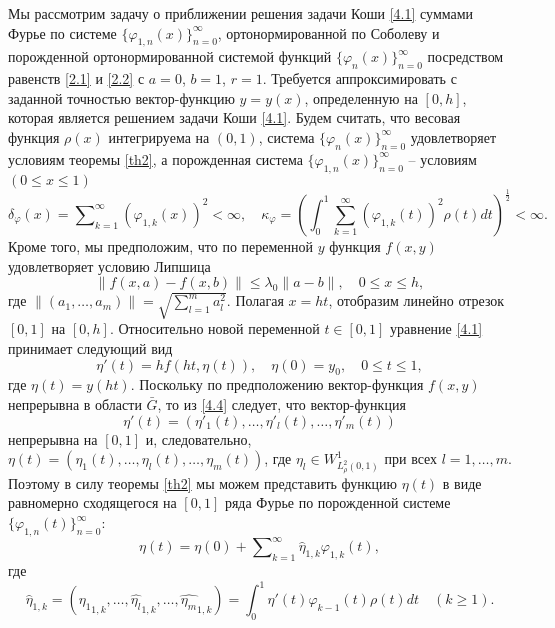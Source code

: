 Мы рассмотрим задачу о приближении решения задачи Коши \eqref{4.1}     суммами  Фурье по системе $\{\varphi_{1,n}(x)\}_{n=0}^\infty$, ортонормированной по Соболеву и порожденной ортонормированной системой функций $\{\varphi_{n}(x)\}_{n=0}^\infty$ посредством равенств \eqref{2.1} и \eqref{2.2} с $a=0$, $b=1$, $r=1$.
Требуется аппроксимировать с заданной точностью вектор-функцию $y=y(x)$, определенную на $[0,h]$, которая является решением задачи Коши \eqref{4.1}.
Будем считать, что весовая функция $\rho(x)$ интегрируема на $(0,1)$, система $\{\varphi_{n}(x)\}_{n=0}^\infty$ удовлетворяет условиям теоремы \ref{th2}, а порожденная система $\{\varphi_{1,n}(x)\}_{n=0}^\infty$ -- условиям $(0\le x\le 1)$
\begin{equation}\label{4.2}
\delta_\varphi(x)=\sum\nolimits_{k=1}^{\infty}(\varphi_{1,k}(x))^2<\infty,\quad
\kappa_{\varphi}=\left(\int_0^1\sum_{k=1}^{\infty}
(\varphi_{1,k}(t))^2\rho(t)dt\right)^{\frac12}<\infty.
\end{equation}
Кроме того, мы предположим, что по переменной $y$ функция $f(x,y)$ удовлетворяет условию Липшица
\begin{equation}\label{4.3}
\|f(x,a)-f(x,b)\|\le \lambda_0\|a-b\|, \quad 0\le x \le h,
\end{equation}
где $\|(a_1,\ldots,a_m)\|=\sqrt{\sum_{l=1}^ma_l^2}$. Полагая $x=ht$, отобразим линейно отрезок $[0,1]$ на $[0,h]$. Относительно новой переменной $t\in [0,1]$ уравнение \eqref{4.1} принимает следующий вид
\begin{equation}\label{4.4}
\eta'(t)=hf(ht,\eta(t)), \quad \eta(0)=y_0,\quad 0\le t\le 1,
\end{equation}
где $\eta(t)=y(ht)$.  Поскольку по предположению вектор-функция $f(x,y)$ непрерывна в области $\bar G$, то из \eqref{4.4} следует, что  вектор-функция $$\eta'(t)=(\eta'_1(t),\ldots,\eta'_l(t),\ldots,\eta'_m(t))$$ непрерывна на $[0,1]$ и, следовательно, $\eta(t)=(\eta_1(t),\ldots,\eta_l(t),\ldots,\eta_m(t))$, где $\eta_l\in W_{L_\rho^2(0,1)}^1$ при всех $l=1,\ldots,m$. Поэтому в силу теоремы \ref{th2}  мы можем представить  функцию $\eta(t)$ в виде равномерно сходящегося на $[0,1]$ ряда Фурье по порожденной системе $\{\varphi_{1,n}(t)\}_{n=0}^\infty$:
\begin{equation}\label{4.5}
\eta(t)= \eta(0)+ \sum\nolimits_{k=1}^\infty \hat \eta_{1,k}\varphi_{1,k}(t),
\end{equation}
где
\begin{equation}\label{4.6}
\hat \eta_{1,k}=(\widehat{\eta_1}_{1,k},\ldots,\widehat {\eta_l}_{1,k},\ldots,\widehat{\eta_m}_{1,k})=\int_{0}^1 \eta'(t)\varphi_{k-1}(t)\rho(t)dt\quad(k\ge1).
\end{equation}
